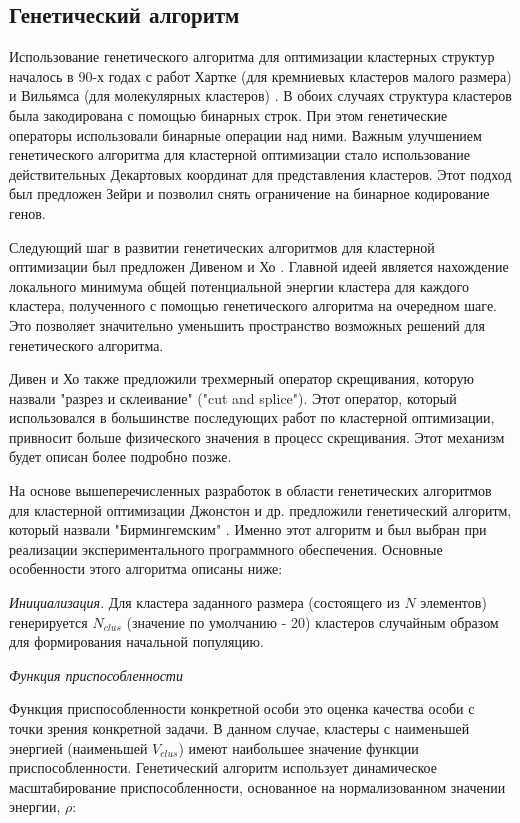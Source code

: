 \subsection{Генетический алгоритм}
\label{sec:1c}

Использование генетического алгоритма для оптимизации кластерных структур
началось в 90-х годах с работ Хартке (для кремниевых кластеров малого размера)
\cite{hartke} и Вильямса (для молекулярных кластеров) \cite{williams}. В обоих
случаях структура кластеров была закодирована с помощью бинарных строк. При этом
генетические операторы использовали бинарные операции над ними. Важным улучшением
генетического алгоритма для кластерной оптимизации стало использование действительных
Декартовых координат для представления кластеров. Этот подход был предложен
Зейри \cite{zeiri} и позволил снять ограничение на бинарное кодирование генов.

Следующий шаг в развитии генетических алгоритмов для кластерной оптимизации был
предложен Дивеном и Хо \cite{deaven}. Главной идеей является нахождение локального
минимума общей потенциальной энергии кластера для каждого кластера, полученного
с помощью генетического алгоритма на очередном шаге. Это позволяет значительно
уменьшить пространство возможных решений для генетического алгоритма.

Дивен и Хо также предложили трехмерный оператор скрещивания, которую назвали
"разрез и склеивание" ("cut and splice"). Этот оператор, который использовался
в большинстве последующих работ по кластерной оптимизации, привносит больше 
физического значения в процесс скрещивания. Этот механизм будет описан более
подробно позже.

На основе вышеперечисленных разработок в области генетических алгоритмов для
кластерной оптимизации Джонстон и др. предложили генетический алгоритм,
который назвали "Бирмингемским" \cite{johnston}. Именно этот алгоритм и был
выбран при реализации экспериментального программного обеспечения.
Основные особенности этого алгоритма описаны ниже:

{\it Инициализация}.  %
Для кластера заданного размера (состоящего из $N$ элементов) генерируется $N_{clus}$
(значение по умолчанию - 20) кластеров случайным образом для формирования начальной
популяцию.

{\it Функция приспособленности}

Функция приспособленности конкретной особи это оценка качества особи с точки зрения
конкретной задачи. В данном случае, кластеры с наименьшей энергией (наименьшей $V_{clus}$)
имеют наибольшее значение функции приспособленности. Генетический алгоритм использует
динамическое масштабирование приспособленности, основанное на нормализованном значении
энергии, $\rho$:

